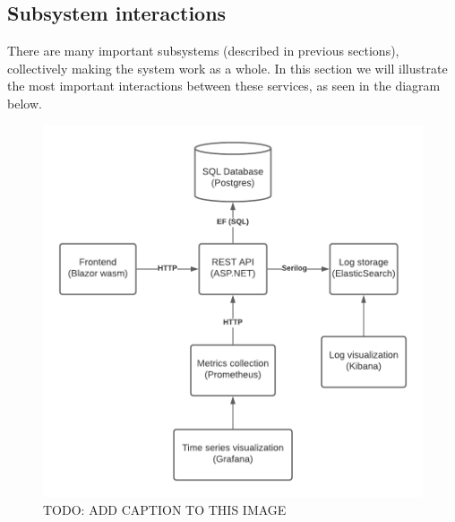   \subsection{Subsystem interactions}
  There are many important subsystems (described in previous sections), collectively making the system work as a whole.
  In this section we will illustrate the most important interactions between these services, as seen in the diagram below.\newline

\begin{figure}[h!]
    \centering
    \includegraphics[scale=0.7]{images/InteractionDiagram.png}
    \caption{ TODO: ADD CAPTION TO THIS IMAGE}
\end{figure}  

